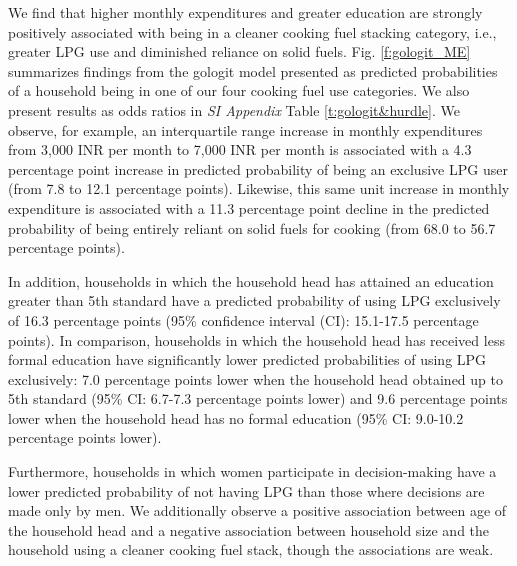 \documentclass[11pt,english]{article}
\theoremstyle{plain} \newtheorem{claim}{Claim}
\theoremstyle{plain} \newtheorem{prop}{Proposition}
\theoremstyle{plain} \newtheorem{hypo}{Hypothesis}
\begin{document}
We find that higher monthly expenditures and greater education are strongly positively associated with being in a cleaner cooking fuel stacking category, i.e., greater LPG use and diminished reliance on solid fuels. Fig. \ref{f:gologit_ME} summarizes findings from the gologit model presented as predicted probabilities of a household being in one of our four cooking fuel use categories. We also present results as odds ratios in \textit{SI Appendix} Table \ref{t:gologit&hurdle}. We observe, for example, an interquartile range increase in monthly expenditures from 3,000 INR per month to 7,000 INR per month is associated with a 4.3 percentage point increase in predicted probability of being an exclusive LPG user (from 7.8 to 12.1 percentage points). Likewise, this same unit increase in monthly expenditure is associated with a 11.3 percentage point decline in the predicted probability of being entirely reliant on solid fuels for cooking (from 68.0 to 56.7 percentage points).

In addition, households in which the household head has attained an education greater than 5th standard have a predicted probability of using LPG exclusively of 16.3 percentage points (95\% confidence interval (CI): 15.1-17.5 percentage points). In comparison, households in which the household head has received less formal education have significantly lower predicted probabilities of using LPG exclusively: 7.0 percentage points lower when the household head obtained up to 5th standard (95\% CI: 6.7-7.3 percentage points lower) and 9.6 percentage points lower when the household head has no formal education (95\% CI: 9.0-10.2 percentage points lower). 

Furthermore, households in which women participate in decision-making have a lower predicted probability of not having LPG than those where decisions are made only by men. We additionally observe a positive association between age of the household head and a negative association between household size and the household using a cleaner cooking fuel stack, though the associations are weak.
\end{document}

